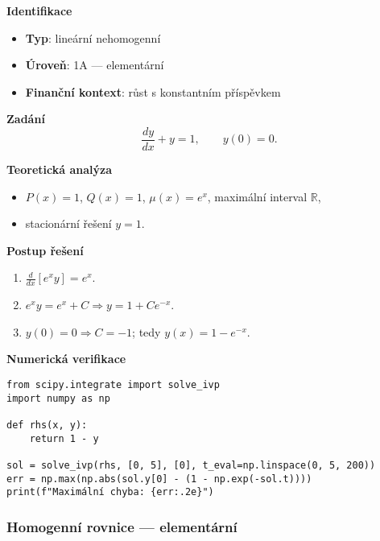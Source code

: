 \begin{example}
\label{ex:1a4}

\textbf{Identifikace}
\begin{itemize}
\item \textbf{Typ}: lineární nehomogenní
\item \textbf{Úroveň}: 1A — elementární
\item \textbf{Finanční kontext}: růst s konstantním příspěvkem
\end{itemize}

\textbf{Zadání}
\[
\frac{dy}{dx} + y = 1, \qquad y(0)=0.
\]

\textbf{Teoretická analýza}
\begin{itemize}
\item $P(x)=1$, $Q(x)=1$, $\mu(x)=e^{x}$, maximální interval $\mathbb{R}$,
\item stacionární řešení $y=1$.
\end{itemize}

\textbf{Postup řešení}
\begin{enumerate}
\item $\frac{d}{dx}[e^{x}y]=e^{x}$.
\item $e^{x}y=e^{x}+C \Rightarrow y=1+Ce^{-x}$.
\item $y(0)=0 \Rightarrow C=-1$; tedy $y(x)=1-e^{-x}$.
\end{enumerate}

\textbf{Numerická verifikace}
\begin{verbatim}
from scipy.integrate import solve_ivp
import numpy as np

def rhs(x, y):
    return 1 - y

sol = solve_ivp(rhs, [0, 5], [0], t_eval=np.linspace(0, 5, 200))
err = np.max(np.abs(sol.y[0] - (1 - np.exp(-sol.t))))
print(f"Maximální chyba: {err:.2e}")
\end{verbatim}
\end{example}

\subsubsection{Homogenní rovnice — elementární}
\label{subsec:1a-homogenni}


